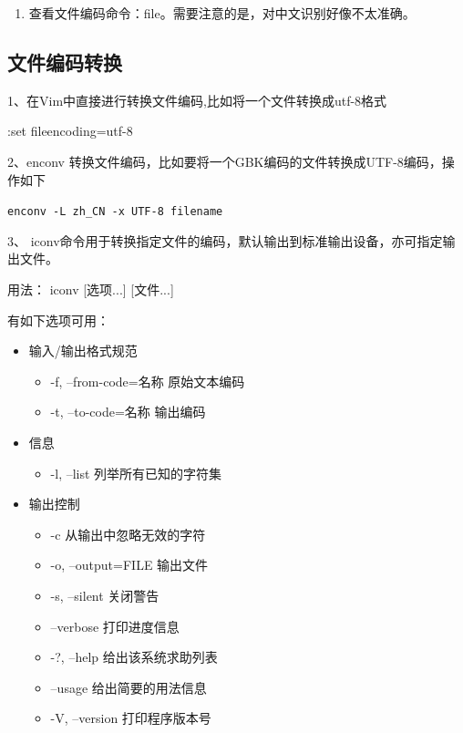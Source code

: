 {\begin{enumerate}
\begin{itemize}
set encoding=utf-8 fileencodings=ucs-bom,utf-8,cp936

这样，就可以让vim自动识别文件编码（可以自动识别UTF-8或者GBK编码的文件），其实就是依照 fileencodings提供的编码列表尝试，如果没有找到合适的编码，就用latin-1(ASCII)编码打开。
\end{itemize}


\item 查看文件编码命令：file。需要注意的是，对中文识别好像不太准确。
\end{enumerate}



\subsection{文件编码转换}
1、在Vim中直接进行转换文件编码,比如将一个文件转换成utf-8格式

:set fileencoding=utf-8

2、enconv 转换文件编码，比如要将一个GBK编码的文件转换成UTF-8编码，操作如下

\verb|enconv -L zh_CN -x UTF-8 filename|

3、 iconv命令用于转换指定文件的编码，默认输出到标准输出设备，亦可指定输出文件。  

用法： iconv [选项...] [文件...]  

有如下选项可用：
\begin{itemize}
\item 输入/输出格式规范
	\begin{itemize}
	\item  -f, --from-code=名称 原始文本编码  
	\item -t, --to-code=名称 输出编码  
	\end{itemize}
\item 信息
	\begin{itemize}
	\item  -l, --list 列举所有已知的字符集    
	\end{itemize}
\item 输出控制
	\begin{itemize}
	\item  -c 从输出中忽略无效的字符  
	\item -o, --output=FILE 输出文件  
	\item -s, --silent 关闭警告  
	\item --verbose 打印进度信息  
	\item -?, --help 给出该系统求助列表  
	\item --usage 给出简要的用法信息  
	\item -V, --version 打印程序版本号   
	\end{itemize}
\end{itemize}  

}
